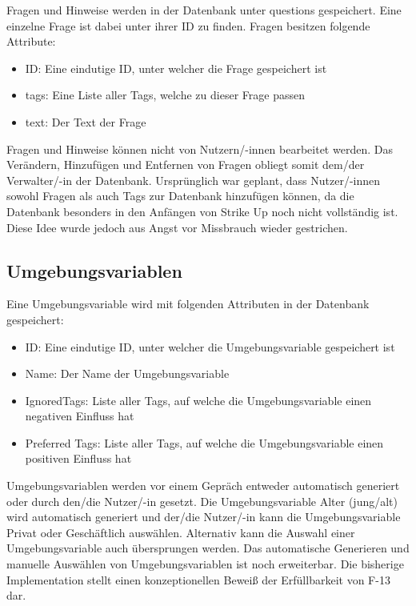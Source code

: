 Fragen und Hinweise werden in der Datenbank unter \glqq{}questions\grqq{} gespeichert. Eine einzelne Frage ist dabei unter ihrer ID zu finden. \newline
Fragen besitzen folgende Attribute:
\begin{itemize}
    \item ID: Eine eindutige ID, unter welcher die Frage gespeichert ist
    \item tags: Eine Liste aller Tags, welche zu dieser Frage passen
    \item text: Der Text der Frage
\end{itemize}
Fragen und Hinweise können nicht von Nutzern/-innen bearbeitet werden. Das Verändern, Hinzufügen und Entfernen von Fragen obliegt somit dem/der Verwalter/-in der Datenbank. \newline
Ursprünglich war geplant, dass Nutzer/-innen sowohl Fragen als auch Tags zur Datenbank hinzufügen können, da die Datenbank besonders in den Anfängen von Strike Up noch nicht vollständig
ist. Diese Idee wurde jedoch aus Angst vor Missbrauch wieder gestrichen.

\subsection{Umgebungsvariablen}
\label{subsec:umgebungsvariablen}

Eine Umgebungsvariable wird mit folgenden Attributen in der Datenbank gespeichert:
\begin{itemize}
    \item ID: Eine eindutige ID, unter welcher die Umgebungsvariable gespeichert ist
    \item Name: Der Name der Umgebungsvariable
    \item IgnoredTags: Liste aller Tags, auf welche die Umgebungsvariable einen negativen Einfluss hat
    \item Preferred Tags: Liste aller Tags, auf welche die Umgebungsvariable einen positiven Einfluss hat
\end{itemize}
Umgebungsvariablen werden vor einem Gepräch entweder automatisch generiert oder durch den/die Nutzer/-in gesetzt. \newline
Die Umgebungsvariable Alter (jung/alt) wird automatisch generiert und der/die Nutzer/-in kann die Umgebungsvariable \glqq{}Privat\grqq{} oder \glqq{}Geschäftlich\grqq{}
auswählen. Alternativ kann die Auswahl einer Umgebungsvariable auch übersprungen werden. \newline
Das automatische Generieren und manuelle Auswählen von Umgebungsvariablen ist noch erweiterbar. Die bisherige Implementation stellt einen konzeptionellen Beweiß der Erfüllbarkeit von F-13 dar.

